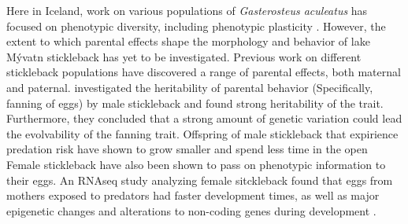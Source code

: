 \documentclass[12pt]{extarticle}
\begin{document}
Here in Iceland, work on various populations of \textit{Gasterosteus aculeatus} has focused on phenotypic diversity, including phenotypic plasticity \citep{Kristjansson2002, Millet2013}. However, the extent to which parental effects shape the morphology and behavior of lake M\'yvatn stickleback has yet to be investigated. Previous work on different stickleback populations have discovered a range of parental effects, both maternal and paternal. \citet{Bell2018} investigated the heritability of parental behavior (Specifically, fanning of eggs) by male stickleback and found strong heritability of the trait. Furthermore, they concluded that a strong amount of genetic variation could lead the evolvability of the fanning trait. Offspring of male stickleback that expirience predation risk have shown to grow smaller and spend less time in the open \citep{Bell2016, Stein2014} Female stickleback have also been shown to pass on phenotypic information to their eggs. An RNAseq study analyzing female sitckleback found that eggs from mothers exposed to predators had faster development times, as well as major epigenetic changes and alterations to non-coding genes during development \citep{Mommer2014, Bell2016}.  \\
\end{document}
